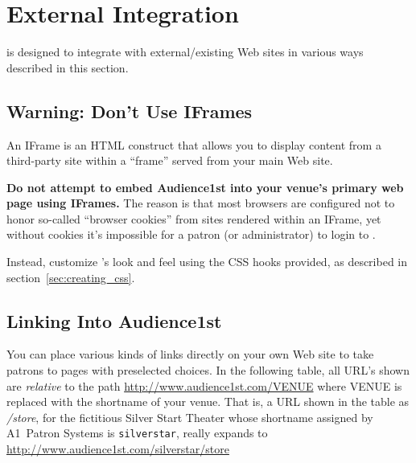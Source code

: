 \section{External Integration}
\label{sec:external-integration}

\af is designed to integrate with external/existing Web sites in various
ways described in this section.

\subsection{Warning: Don't Use IFrames}
\label{sec:iframes}

An IFrame is an HTML construct that allows you to display content from a
third-party site within a ``frame'' served from your main Web site.

\textbf{Do not attempt to embed Audience1st into your venue's primary
  web page using IFrames.}  The reason is that most browsers are
configured not to honor so-called ``browser cookies'' from sites
rendered within an IFrame, yet without cookies it's impossible for a
patron (or administrator) to login to \af.

Instead, customize \af's look and feel using the CSS hooks provided, as
described in section~\ref{sec:creating_css}.

\subsection{Linking Into Audience1st}
\label{sec:linking}

You can place various kinds of links directly on your own Web site to
take patrons to \af pages with preselected choices.  In the following
table, all URL's shown are \emph{relative} to the path
\url{http://www.audience1st.com/VENUE} where VENUE is replaced with the
shortname of your venue.  That is, a URL shown in the table as
\emph{/store}, for the fictitious Silver Start Theater  whose shortname
assigned by A1~Patron Systems is \verb+silverstar+, really expands to
\url{http://www.audience1st.com/silverstar/store} 

